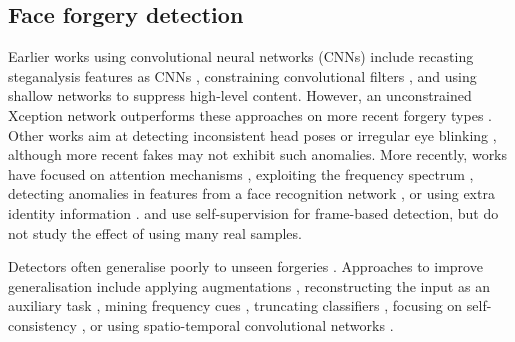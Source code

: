 \documentclass[10pt,twocolumn,letterpaper]{article}
\begin{document}
\subsection{Face forgery detection}
\begin{description}[wide,itemindent=\labelsep]
\item[General approaches.] Earlier works using convolutional neural networks (CNNs) include recasting steganalysis features as CNNs \cite{cozzolino2017recasting}, constraining convolutional filters \cite{bayar2016deep}, and using shallow networks \cite{afchar2018mesonet} to suppress high-level content. However, an unconstrained Xception \cite{chollet2017xception} network outperforms these approaches on more recent forgery types \cite{rossler2019faceforensics++}. Other works aim at detecting inconsistent head poses \cite{yang2019exposing} or irregular eye blinking \cite{li2018ictu}, although more recent fakes may not exhibit such anomalies. More recently, works have focused on attention mechanisms \cite{dang2020detection, zhao2021multi, wang2021representative}, exploiting the frequency spectrum \cite{durall2020watch, frank2020leveraging, qian2020thinking, luo2021generalizing, masi2020two, liu2021spatial, li2021frequency}, detecting anomalies in features from a face recognition network \cite{wang2019fakespotter}, or using extra identity information \cite{cozzolino2021id, agarwal2019protecting, dong2020identity}. \cite{fung2021deepfakeucl} and \cite{zhang2021deepfake} use self-supervision for frame-based detection, but do not study the effect of using many real samples.

\item[Cross-manipulation generalisation.] Detectors often generalise poorly to unseen forgeries \cite{cozzolino2018forensictransfer, li2020face, haliassos2021lips, chai2020makes, wang2020cnn}. Approaches to improve generalisation include applying augmentations \cite{wang2020cnn}, reconstructing the input as an auxiliary task \cite{cozzolino2018forensictransfer, du2019towards, nguyen2019multi}, mining frequency cues \cite{masi2020two, luo2021generalizing}, truncating classifiers \cite{chai2020makes}, focusing on self-consistency \cite{li2020face, zhao2021learning, li2018exposing, huh2018fighting}, or using spatio-temporal convolutional networks \cite{ganiyusufoglu2020spatio}. 


\end{description}
\end{document}
